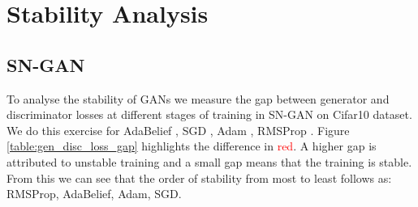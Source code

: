 



\section{Stability Analysis}
\subsection{SN-GAN}
To analyse the stability of GANs we measure the gap between generator and discriminator losses at different stages of training in SN-GAN \cite{SN-GAN} on Cifar10 dataset. We do this exercise for AdaBelief \cite{zhuang_adabelief_2020}, SGD \cite{SGD}, Adam \cite{Adam}, RMSProp \cite{RMSProp}. Figure \ref{table:gen_disc_loss_gap} highlights the difference in \textcolor{red}{red}. A higher gap is attributed to unstable training and a small gap means that the training is stable. From this we can see that the order of stability from most to least follows as: RMSProp, AdaBelief, Adam, SGD.

